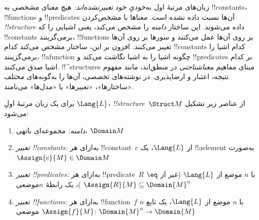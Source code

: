 \documentclass[../../../include/open-logic-section]{subfiles}
\begin{document}


\begin{explain}
زبان‌های مرتبهٔ اول به‌خودیِ خود \emph{تعبیرنشده‌اند:} هیچ معنای
مشخصی به !!{constant}s، !!{function}s و !!{predicate}s آن‌ها نسبت
داده نشده است. معناها با مشخص‌کردن 
\emph{!!{structure}} داده می‌شوند. این ساختار \emph{دامنه} را
مشخص می‌کند، یعنی اشیایی را که !!{constant}s برمی‌گزینند،
!!{function}s بر روی آن‌ها عمل می‌کنند و سورها بر روی آن‌ها تغییر
می‌کنند. افزون بر این، ساختار مشخص می‌کند کدام !!{constant}s کدام
اشیا را برمی‌گزینند، !!a{function} چگونه اشیا را به اشیا نگاشت می‌کند
و !!{predicate}s بر کدام اشیا صدق می‌کنند. !!^{structure}s مبنای
مفاهیم \emph{معناشناختی} در منطق‌اند، مانند مفهوم نتیجه، اعتبار و
ارضاپذیری. در نوشته‌های تخصصی، آن‌ها را به‌گونه‌های مختلف «ساختارها»،
«تعبیرها» یا «مدل‌ها» می‌نامند.
\end{explain}

\begin{defn}[!!^{structure}s]
برای یک زبان مرتبهٔ اولِ $\Lang{L}$، 
\emph{!!{structure}}~$\Struct M$ از عناصر زیر تشکیل می‌شود:
\begin{enumerate}
\item \emph{دامنه:} مجموعه‌ای ناتهی، $\Domain M$
\item \emph{تعبیر !!{constant}s:} به‌ازای هر !!{constant}~$c$ از
  $\Lang{L}$، یک !!a{element} به‌صورت
  $\Assign{c}{M} \in \Domain M$
\item \emph{تعبیر !!{predicate}s:} به‌ازای هر !!{predicate}~$R$
  با $n$ موضع از $\Lang{L}$ (غیر از $\eq$)، یک رابطهٔ $n$موضعی
  $\Assign{R}{M} \subseteq \Domain{M}^n$
\item \emph{تعبیر !!{function}s:} به‌ازای هر !!{function}~$f$
  با $n$ موضع از $\Lang{L}$، یک تابع $n$موضعی
  $\Assign{f}{M} \colon \Domain{M}^n \to \Domain{M}$
\end{enumerate}
\end{defn}
\end{document}
